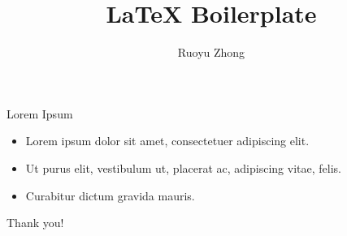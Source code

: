 \documentclass[aspectratio=169]{beamer}
\title{LaTeX Boilerplate}
\author{Ruoyu Zhong}
\date{}
\begin{document}
\begin{frame}
  \titlepage
\end{frame}

\begin{frame}{Lorem Ipsum}
  \begin{itemize}
    \item Lorem ipsum dolor sit amet, consectetuer adipiscing elit.
      \pause
    \item Ut purus elit, vestibulum ut, placerat ac, adipiscing vitae, felis.
      \pause
    \item Curabitur dictum gravida mauris.
  \end{itemize}
\end{frame}

\begin{frame}[standout]
  Thank you!
\end{frame}
\end{document}
